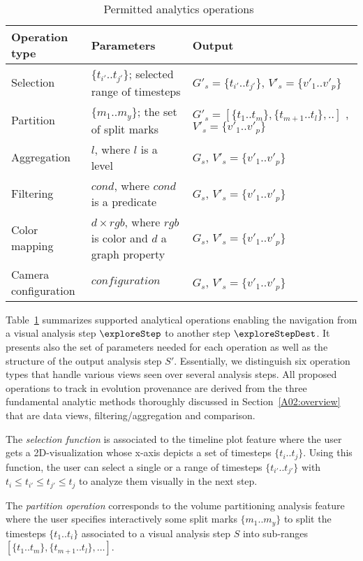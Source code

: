 \begin{table}[t]
 \centering \scriptsize
 \begin{tabular}{|p{2.5cm}|p{4cm}|p{3cm}|} \hline
\textbf{Operation type}  & \textbf{Parameters} & \textbf{Output}  \\ \hline
Selection&  $\{t_{i'}..t_{j'}\}$; selected range of timesteps & $G'_{s}=\{t_{i'}..t_{j'}\}$,  $V'_{s}=\{v'_{1}..v'_{p}\}$ \\ \hline
Partition&$\{m_1..m_y\}$; the set of split marks & $G'_{s}=[\{t_1..t_m\},\{t_{m+1}..t_l\},..]$ ,  $V'_{s}=\{v'_{1}..v'_{p}\}$  \\ \hline
Aggregation&    $l$, where $l$ is a level & $G_{s}$,  $V'_{s}=\{v'_{1}..v'_{p}\}$ \\ \hline
Filtering&    $cond$, where $cond$ is a predicate& $G_{s}$,  $V'_{s}=\{v'_{1}..v'_{p}\}$  \\ \hline
Color mapping&  $d \times rgb $, where $rgb$ is color and $d$ a graph property &$G_{s}$,  $V'_{s}=\{v'_{1}..v'_{p}\}$  \\ \hline
Camera configuration&  $configuration$   & $G_{s}$, $V'_{s}=\{v'_{1}..v'_{p}\}$  \\ \hline
\end{tabular}
\caption{Permitted analytics operations~\cite{Bruder2019}}
\label{table:ops}
 \end{table}

Table~\ref{table:ops} summarizes supported analytical operations enabling the navigation from a visual analysis step $\exploreStep$ to another step $\exploreStepDest$.
It presents also the set of parameters needed for each operation as well as the structure of the output analysis step $S'$.
Essentially, we distinguish six operation types that handle various views seen over several analysis steps.
All proposed operations to track in evolution provenance are derived from the three fundamental analytic methods thoroughly discussed in Section~\ref{A02:overview} that are data views, filtering/aggregation and comparison.


The \emph{selection function} is associated to the timeline plot feature where the user gets a 2D-visualization whose x-axis depicts a set of timesteps $\{t_i..t_j\}$.
Using this function, the user can select a single or a range of timesteps $\{t_{i'}..t_{j'}\}$  with $t_i \leq t_{i'} \leq t_{j'} \leq t_{j}$ to analyze them visually in the next step.

The \emph{partition operation} corresponds to the volume partitioning analysis feature 
where the user specifies interactively some split marks $\{m_1..m_y\}$ to split the timesteps $\{t_1..t_i\}$ associated to a visual analysis step $S$ into sub-ranges $[\{t_1..t_m\},\{t_{m+1}..t_l\},\ldots]$. 


